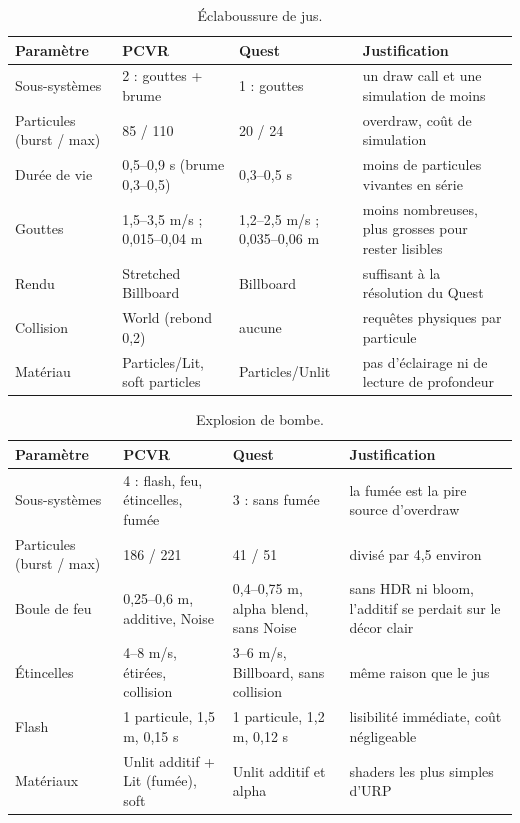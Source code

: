 \documentclass[11pt,a4paper]{article}
\begin{document}
\begin{table}[H]
\centering\small
\caption{Éclaboussure de jus.}
\begin{tabularx}{\textwidth}{@{}P{2.6cm}P{3.6cm}P{3.1cm}L@{}}
\toprule
Paramètre & PCVR & Quest & Justification \\
\midrule
Sous-systèmes & 2 : gouttes + brume & 1 : gouttes & un draw call et une simulation de moins \\
Particules (burst / max) & 85 / 110 & 20 / 24 & overdraw, coût de simulation \\
Durée de vie & 0,5--0,9 s (brume 0,3--0,5) & 0,3--0,5 s & moins de particules vivantes en série \\
Gouttes & 1,5--3,5 m/s ; 0,015--0,04 m & 1,2--2,5 m/s ; 0,035--0,06 m & moins nombreuses, plus grosses pour rester lisibles \\
Rendu & Stretched Billboard & Billboard & suffisant à la résolution du Quest \\
Collision & World (rebond 0,2) & aucune & requêtes physiques par particule \\
Matériau & Particles/Lit, soft particles & Particles/Unlit & pas d'éclairage ni de lecture de profondeur \\
\bottomrule
\end{tabularx}
\end{table}

\begin{table}[H]
\centering\small
\caption{Explosion de bombe.}
\begin{tabularx}{\textwidth}{@{}P{2.6cm}P{3.6cm}P{3.1cm}L@{}}
\toprule
Paramètre & PCVR & Quest & Justification \\
\midrule
Sous-systèmes & 4 : flash, feu, étincelles, fumée & 3 : sans fumée & la fumée est la pire source d'overdraw \\
Particules (burst / max) & 186 / 221 & 41 / 51 & divisé par 4,5 environ \\
Boule de feu & 0,25--0,6 m, additive, Noise & 0,4--0,75 m, alpha blend, sans Noise & sans HDR ni bloom, l'additif se perdait sur le décor clair \\
Étincelles & 4--8 m/s, étirées, collision & 3--6 m/s, Billboard, sans collision & même raison que le jus \\
Flash & 1 particule, 1,5 m, 0,15 s & 1 particule, 1,2 m, 0,12 s & lisibilité immédiate, coût négligeable \\
Matériaux & Unlit additif + Lit (fumée), soft & Unlit additif et alpha & shaders les plus simples d'URP \\
\bottomrule
\end{tabularx}
\end{table}
\end{document}
